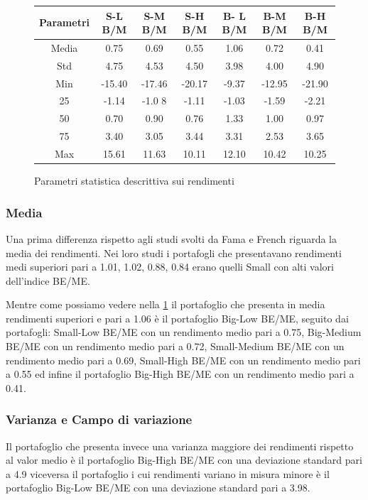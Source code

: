 \medskip
\begin{center}
\begin{figure}
	
	\begin{tabular}{ccccccc}
		\toprule
		Parametri          & S-L B/M  & S-M B/M & S-H B/M  & B- L B/M & B-M B/M & B-H B/M \\
		\midrule
		Media & 	0.75 & 0.69 &0.55 & 1.06 & 0.72 & 0.41\\
		Std & 4.75&	4.53 & 4.50 & 3.98 &  4.00& 4.90 \\
		Min  & -15.40 & -17.46 & -20.17 & -9.37 & -12.95 & -21.90 \\ 	
		25  & -1.14 &	-1.0 8 & -1.11 & -1.03 & -1.59 & -2.21 \\
		50 & 0.70  & 0.90 & 0.76 & 1.33 & 1.00  & 0.97 \\
		75 & 3.40 & 3.05 & 3.44 & 3.31 & 2.53 & 3.65 \\
		Max & 15.61	& 11.63 & 10.11 & 12.10 & 10.42 & 10.25 \\ 
		\hline
			\end{tabular}

	\caption{Parametri statistica descrittiva sui rendimenti}
	\label{tab:truthTables15} 
\end{figure}
  	\end{center}
\subsubsection{Media}
Una prima differenza rispetto agli studi svolti da Fama e French riguarda la media dei rendimenti. Nei loro studi i portafogli che presentavano rendimenti medi superiori pari a 1.01, 1.02, 0.88, 0.84 erano quelli Small con alti valori dell'indice BE/ME. 

Mentre come possiamo vedere nella \ref{tab:truthTables15} il portafoglio che presenta in media rendimenti superiori e pari a 1.06 è il portafoglio Big-Low BE/ME, seguito dai portafogli: Small-Low BE/ME con un rendimento medio pari a 0.75, Big-Medium BE/ME con un rendimento medio pari a 0.72, Small-Medium BE/ME con un rendimento medio pari a 0.69, Small-High BE/ME  con un rendimento medio pari a 0.55 ed infine il portafoglio Big-High BE/ME  con un rendimento medio pari a 0.41. 

\subsubsection{Varianza e Campo di variazione}

Il portafoglio che presenta invece una varianza maggiore dei rendimenti rispetto al valor medio è il portafoglio Big-High BE/ME con una deviazione standard pari a 4.9 viceversa il portafoglio i cui rendimenti variano in misura minore è il portafoglio Big-Low BE/ME con una deviazione standard pari a 3.98.

